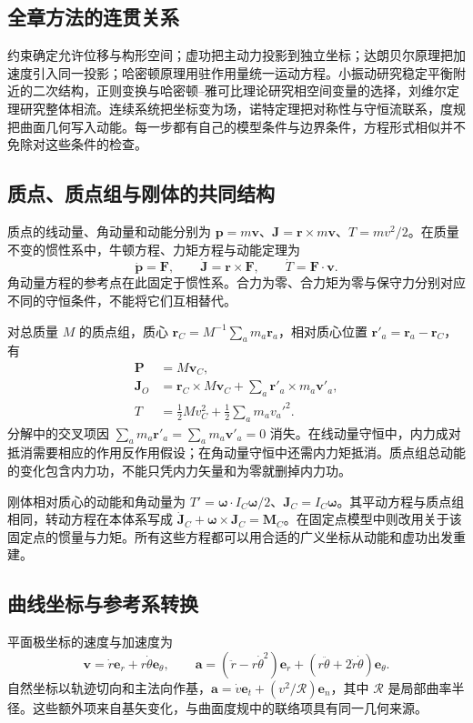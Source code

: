 \documentclass[UTF8,zihao=-4,fontset=fandol,a4paper]{ctexart}
\newcommand{\vect}[1]{\bm{#1}}\newcommand{\dd}{\mathrm d}\newcommand{\pd}{\partial}
\begin{document}
\subsection{全章方法的连贯关系}
约束确定允许位移与构形空间；虚功把主动力投影到独立坐标；达朗贝尔原理把加速度引入同一投影；哈密顿原理用驻作用量统一运动方程。小振动研究稳定平衡附近的二次结构，正则变换与哈密顿--雅可比理论研究相空间变量的选择，刘维尔定理研究整体相流。连续系统把坐标变为场，诺特定理把对称性与守恒流联系，度规把曲面几何写入动能。每一步都有自己的模型条件与边界条件，方程形式相似并不免除对这些条件的检查。

\subsection{质点、质点组与刚体的共同结构}
质点的线动量、角动量和动能分别为 $\vect p=m\vect v$、$\vect J=\vect r\times m\vect v$、$T=mv^2/2$。在质量不变的惯性系中，牛顿方程、力矩方程与动能定理为
\[
\dot{\vect p}=\vect F,\qquad
\dot{\vect J}=\vect r\times\vect F,\qquad
\dot T=\vect F\cdot\vect v.
\]
角动量方程的参考点在此固定于惯性系。合力为零、合力矩为零与保守力分别对应不同的守恒条件，不能将它们互相替代。

对总质量 $M$ 的质点组，质心 $\vect r_C=M^{-1}\sum_a m_a\vect r_a$，相对质心位置 $\vect r'_a=\vect r_a-\vect r_C$，有
\begin{align*}
\vect P&=M\vect v_C,\\
\vect J_O&=\vect r_C\times M\vect v_C+\sum_a\vect r'_a\times m_a\vect v'_a,\\
T&=\frac12M v_C^2+\frac12\sum_a m_a v_a'^2.
\end{align*}
分解中的交叉项因 $\sum_a m_a\vect r'_a=\sum_a m_a\vect v'_a=0$ 消失。在线动量守恒中，内力成对抵消需要相应的作用反作用假设；在角动量守恒中还需内力矩抵消。质点组总动能的变化包含内力功，不能只凭内力矢量和为零就删掉内力功。

刚体相对质心的动能和角动量为 $T'=\vect\omega\cdot I_C\vect\omega/2$、$\vect J_C=I_C\vect\omega$。其平动方程与质点组相同，转动方程在本体系写成 $\dot{\vect J}_C+\vect\omega\times\vect J_C=\vect M_C$。在固定点模型中则改用关于该固定点的惯量与力矩。所有这些方程都可以用合适的广义坐标从动能和虚功出发重建。
\subsection{曲线坐标与参考系转换}
平面极坐标的速度与加速度为
\[
\vect v=\dot r\vect e_r+r\dot\theta\vect e_\theta,
\qquad
\vect a=(\ddot r-r\dot\theta^2)\vect e_r+
(r\ddot\theta+2\dot r\dot\theta)\vect e_\theta.
\]
自然坐标以轨迹切向和主法向作基，$\vect a=\dot v\vect e_t+(v^2/\mathcal R)\vect e_n$，其中 $\mathcal R$ 是局部曲率半径。这些额外项来自基矢变化，与曲面度规中的联络项具有同一几何来源。
\end{document}
